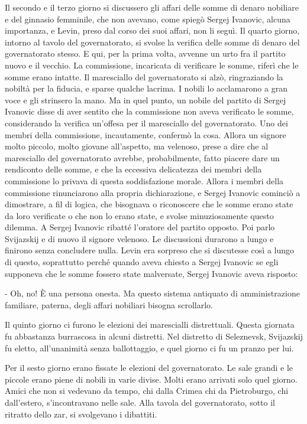 Il secondo e il terzo giorno si discussero gli affari delle somme di denaro nobiliare e del ginnasio femminile, che non avevano, come spiegò Sergej Ivanovic, alcuna importanza, e Levin, preso dal corso dei suoi affari, non li seguì. Il quarto giorno, intorno al tavolo del governatorato, si svolse la verifica delle somme di denaro del governatorato stesso. E qui, per la prima volta, avvenne un urto fra il partito nuovo e il vecchio. La commissione, incaricata di verificare le somme, riferì che le somme erano intatte. Il maresciallo del governatorato si alzò, ringraziando la nobiltà per la fiducia, e sparse qualche lacrima. I nobili lo acclamarono a gran voce e gli strinsero la mano. Ma in quel punto, un nobile del partito di Sergej Ivanovic disse di aver sentito che la commissione non aveva verificato le somme, considerando la verifica un'offesa per il maresciallo del governatorato. Uno dei membri della commissione, incautamente, confermò la cosa. Allora un signore molto piccolo, molto giovane all'aspetto, ma velenoso, prese a dire che al maresciallo del governatorato avrebbe, probabilmente, fatto piacere dare un rendiconto delle somme, e che la eccessiva delicatezza dei membri della commissione lo privava di questa soddisfazione morale. Allora i membri della commissione rinunciarono alla propria dichiarazione, e Sergej Ivanovic cominciò a dimostrare, a fil di logica, che bisognava o riconoscere che le somme erano state da loro verificate o che non lo erano state, e svolse minuziosamente questo dilemma. A Sergej Ivanovic ribatté l'oratore del partito opposto. Poi parlo Svijazskij e di nuovo il signore velenoso. Le discussioni durarono a lungo e finirono senza concludere nulla. Levin era sorpreso che si discutesse così a lungo di questo, soprattutto perché quando aveva chiesto a Sergej Ivanovic se egli supponeva che le somme fossero state malversate, Sergej Ivanovic aveva risposto: 

- Oh, no! È una persona onesta. Ma questo sistema antiquato di amministrazione familiare, paterna, degli affari nobiliari bisogna scrollarlo. 

Il quinto giorno ci furono le elezioni dei marescialli distrettuali. Questa giornata fu abbastanza burrascosa in alcuni distretti. Nel distretto di Seleznevsk, Svijazskij fu eletto, all'unanimità senza ballottaggio, e quel giorno ci fu un pranzo per lui. 

\label{xxvii-4} 

Per il sesto giorno erano fissate le elezioni del governatorato. Le sale grandi e le piccole erano piene di nobili in varie divise. Molti erano arrivati solo quel giorno. Amici che non si vedevano da tempo, chi dalla Crimea chi da Pietroburgo, chi dall'estero, s'incontravano nelle sale. Alla tavola del governatorato, sotto il ritratto dello zar, si svolgevano i dibattiti. 

